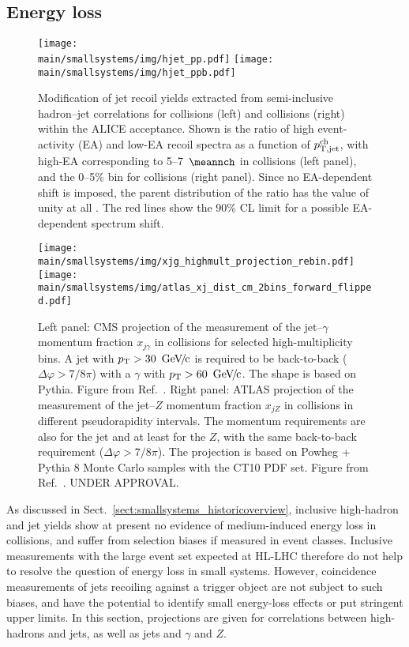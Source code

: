\documentclass[../report.tex]{subfiles}
\providecommand{\main}{..}
\begin{document}
\subsection{Energy loss}
\label{sect:smallsystems_energyloss}

\begin{figure}[t]
\centering
\texttt{[image: \\main/smallsystems/img/hjet\_pp.pdf]}
\hfill
\texttt{[image: \\main/smallsystems/img/hjet\_ppb.pdf]}
\caption{Modification of jet recoil yields extracted from semi-inclusive hadron--jet correlations for \pp collisions (left) and \pPb collisions (right) within the ALICE acceptance. Shown is the ratio  of high event-activity (EA) and low-EA recoil spectra as a function of $p_{\rm T,jet}^{\rm ch}$, with high-EA corresponding to 5--7~$\meannch$ in \pp collisions (left panel), and the 0--5\% bin for \pPb collisions (right panel). Since no EA-dependent shift is imposed, the parent distribution of the ratio has the value of unity at all \pT. The red lines show the 90\% CL limit for a possible EA-dependent spectrum shift.}
\label{fig:smallsystems_energyloss_hjet}
\end{figure}

\begin{figure}[t]
\centering
\texttt{[image: \\main/smallsystems/img/xjg\_highmult\_projection\_rebin.pdf]}
\hfill
\texttt{[image: \\main/smallsystems/img/atlas\_xj\_dist\_cm\_2bins\_forward\_flipped.pdf]}
\caption{Left panel: CMS projection of the measurement of the jet--$\gamma$ momentum fraction $x_{j\gamma}$ in \pp collisions for selected high-multiplicity bins. A jet with $\pT > \unit[30]{\UGeVc}$ is required to be back-to-back ($\Delta\varphi > 7/8\pi$) with a $\gamma$ with $\pT > \unit[60]{\UGeVc}$. The shape is based on Pythia. Figure from Ref.~\cite{CMS-PAS-FTR-18-025}. Right panel: ATLAS projection of the measurement of the jet--$Z$ momentum fraction $x_{jZ}$ in \pPb collisions in different pseudorapidity intervals. The momentum requirements are also \unit[30]{\UGeVc} for the jet and at least \unit[60]{\UGeVc} for the $Z$, with the same back-to-back requirement ($\Delta\varphi > 7/8\pi$). The projection is based on Powheg + Pythia 8 Monte Carlo samples with the CT10 PDF set. Figure from Ref.~\cite{}. UNDER APPROVAL.}
\label{fig:smallsystems_energyloss_xjg_xjz}
\end{figure}

As discussed in Sect.~\ref{sect:smallsystems_historicoverview}, inclusive high-\pT hadron and jet yields show at present no evidence of medium-induced energy loss in \pPb collisions, and suffer from selection biases if measured in event classes. 
Inclusive measurements with the large event set expected at HL-LHC therefore do not help to resolve the question of energy loss in small systems. However, coincidence measurements of jets recoiling against a trigger object are not subject to such biases, and have the potential to identify small energy-loss effects or put stringent upper limits. In this section, projections are given for correlations between high-\pT hadrons and jets, as well as jets and $\gamma$ and $Z$.
\end{document}
